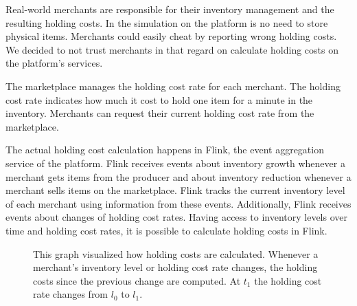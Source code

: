 Real-world merchants are responsible for their inventory management and the resulting holding costs.
In the simulation on the \pricewars platform is no need to store physical items.
Merchants could easily cheat by reporting wrong holding costs.
We decided to not trust merchants in that regard on calculate holding costs on the platform's services.

The marketplace manages the holding cost rate for each merchant.
The holding cost rate indicates how much it cost to hold one item for a minute in the inventory.
Merchants can request their current holding cost rate from the marketplace.

The actual holding cost calculation happens in Flink, the event aggregation service of the \pricewars platform.
Flink receives events about inventory growth whenever a merchant gets items from the producer and about inventory reduction whenever a merchant sells items on the marketplace.
Flink tracks the current inventory level of each merchant using information from these events.
Additionally, Flink receives events about changes of holding cost rates.
Having access to inventory levels over time and holding cost rates, it is possible to calculate holding costs in Flink.

\begin{figure}[t]
\centering
{}
\caption{
	This graph visualized how holding costs are calculated.
	Whenever a merchant's inventory level or holding cost rate changes, the holding costs since the previous change are computed.
	At $t_1$ the holding cost rate changes from $l_0$ to $l_1$.}
\label{fig:holding_cost}
\end{figure}

